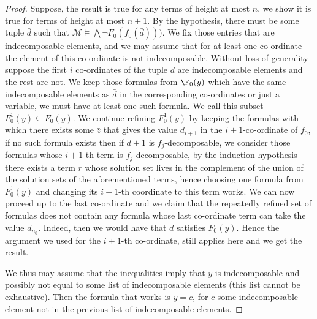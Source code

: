 \documentclass[a4paper,11pt]{article}
\begin{document}
\begin{proof}
Suppose, the result is true for any terms of height at most $n$, we show it is true for terms of height at most $n+1$. By the hypothesis, there must be some tuple $\bar d$ such that $\mathcal{M}\models \bigwedge\lnot F_0(f_0(\bar d)))$. We fix those entries that are indecomposable elements, and we may assume that for at least one co-ordinate the element of this co-ordinate is not indecomposable. Without loss of generality suppose the first $i$ co-ordinates of the tuple $\bar d$ are indecomposable elements and the rest are not. We keep those formulas from $\F_0(y)$ which have the same indecomposable elements as $\bar d$ in the corresponding co-ordinates or just a variable, we must have at least one such formula. We call this subset $F_0^1(y)\subseteq F_0(y)$. We continue refining $F_0^1(y)$ by keeping the formulas with which there exists some $\bar z$ that gives the value $d_{i+1}$ in the $i+1$-co-ordinate of $f_0$, if no such formula exists then if $d+1$ is $f_j$-decomposable, we consider those formulas whose $i+1$-th term is $f_j$-decomposable, by the induction hypothesis there exists a term $r$ whose solution set lives in the complement of the union of the solution sets of the aforementioned terms, hence choosing one formula from $F_0^1(y)$ and changing its $i+1$-th coordinate to this term works. We can now proceed up to the last co-ordinate and we claim that the repeatedly refined set of formulas does not contain any formula whose last co-ordinate term can take the value $d_{n_0}$. Indeed, then we would have that $\bar d$ satisfies $F_0(y)$. Hence the argument we used for the $i+1$-th co-ordinate, still applies here and we get the result. 

We thus may assume that the inequalities imply that $y$ is indecomposable and possibly not equal to some list of indecomposable elements (this list cannot be exhaustive). Then the formula that works is $y=c$, for $c$ some indecomposable element not in the previous list of indecomposable elements.  


\end{proof}
\end{document}

